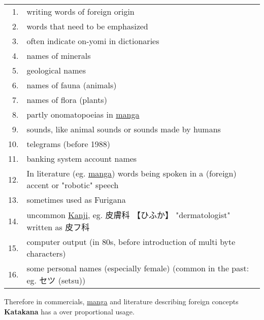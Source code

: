 \begin{tabular}{rp{15cm}}
1.& writing words of foreign origin\\
2.& words that need to be emphasized\\
3. &often indicate on-yomi in dictionaries\\
4.& names of minerals \\
5.& geological names \\
6.& names of fauna (animals)\\
7.& names of flora (plants)\\
8.& partly onomatopoeias in \hyperref[sec:Manga]{manga}\\
9.& sounds, like animal sounds or sounds made by humans\\
10.& telegrams (before 1988)\\
11.& banking system account names\\
12.& In literature (eg. \hyperref[sec:Manga]{manga}) words being spoken in a
(foreign) accent or "robotic" speech\\
13. &sometimes used as Furigana\\
14. & uncommon \hyperref[sec:Kanji]{Kanji}, eg. {皮膚科} {【ひふか】}
"dermatologist" written as {皮フ科}\\
15.& computer output (in 80s, before introduction of multi byte characters)\\
16. &some personal names (especially female) (common in the past: eg.
セツ (setsu))\\

\end{tabular}

\medskip


Therefore in commercials, \hyperref[sec:Manga]{manga} and literature describing
foreign concepts \textbf{Katakana} has a over proportional usage.



%

